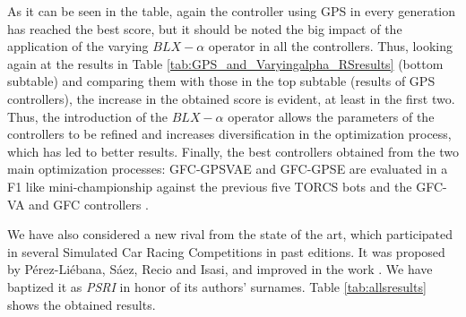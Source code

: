 \documentclass[10pt,journal,compsoc]{IEEEtran}
\begin{document}
%

As it can be seen in the table, again the controller using GPS in
every generation has reached the best score, but it should be noted the
big impact of the application of the varying $BLX-\alpha$ operator in
all the controllers. Thus, looking again at the results in Table \ref{tab:GPS_and_Varyingalpha_RSresults} (bottom subtable) 
and comparing them with those in the top subtable (results of GPS controllers), the increase in the obtained score is evident, at least in the first
two. %
Thus, the introduction of the $BLX-\alpha$ operator allows the parameters of the controllers to be refined and increases diversification in the optimization process, which has led to better results.
Finally, the best controllers obtained from the two main optimization
processes: {\sf GFC-GPSVAE} and {\sf GFC-GPSE} are evaluated in a F1 like
mini-championship against the previous five TORCS bots and the {\sf GFC-VA}\cite{DBLP:conf/cig/SalemMG19} and {\sf GFC} controllers  \cite{salem_cig2018}. 



We have also considered a new rival from the state of the art, which participated in several Simulated Car Racing Competitions in past editions. 
It was proposed by P{\'e}rez-Li{\'e}bana, S{\'a}ez, Recio and Isasi, and improved in the work \cite{PerezEvolvingFuzzy09}. We have baptized it as \textit{PSRI} in honor of its authors' surnames. 
Table \ref{tab:allsresults} shows the obtained results.
%
\end{document}
